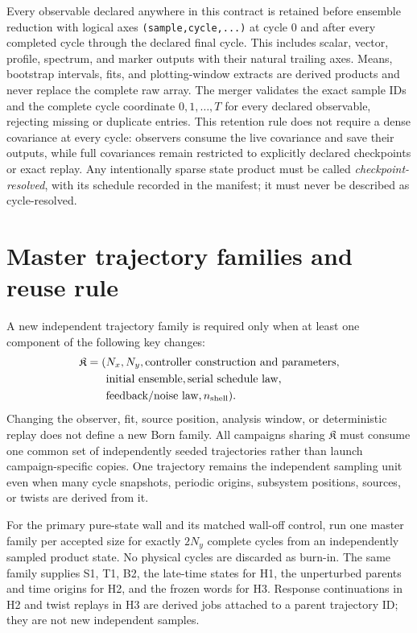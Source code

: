 \documentclass[aps,prx,twocolumn,floatfix,nofootinbib,superscriptaddress,longbibliography]{revtex4-2}
\newcommand{\code}[1]{\texttt{#1}}
\begin{document}
Every observable declared anywhere in this contract is retained before ensemble reduction
with logical axes \code{(sample,cycle,...)} at cycle 0 and after every completed cycle
through the declared final cycle.  This includes scalar, vector, profile, spectrum, and
marker outputs with their natural trailing axes.  Means, bootstrap intervals, fits, and
plotting-window extracts are derived products and never replace the complete raw array.
The merger validates the exact sample IDs and the complete cycle coordinate
$0,1,\ldots,T$ for every declared observable, rejecting missing or duplicate entries.
This retention rule does not require a dense covariance at every cycle: observers consume
the live covariance and save their outputs, while full covariances remain restricted to
explicitly declared checkpoints or exact replay.  Any intentionally sparse state product
must be called \emph{checkpoint-resolved}, with its schedule recorded in the manifest; it
must never be described as cycle-resolved.

\section{Master trajectory families and reuse rule}

A new independent trajectory family is required only when at least one component of the
following key changes:
\begin{equation}
 \begin{aligned}
 \mathfrak K=(&N_x,N_y,\text{controller construction and parameters},\\
              &\text{initial ensemble},\text{serial schedule law},\\
              &\text{feedback/noise law},n_{\rm shell}).
 \end{aligned}
 \label{eq:trajectory-family-key}
\end{equation}
Changing the observer, fit, source position, analysis window, or deterministic replay does
not define a new Born family.  All campaigns sharing $\mathfrak K$ must consume one common
set of independently seeded trajectories rather than launch campaign-specific copies.
One trajectory remains the independent sampling unit even when many cycle snapshots,
periodic origins, subsystem positions, sources, or twists are derived from it.

For the primary pure-state wall and its matched wall-off control, run one master family per
accepted size for exactly $2N_y$ complete cycles from an independently sampled product
state.  No physical cycles are discarded as burn-in.  The same family supplies S1, T1,
B2, the late-time states for H1,
the unperturbed parents and time origins for H2, and the frozen words for H3.
Response continuations in H2 and twist replays in H3 are derived jobs
attached to a parent trajectory ID; they are not new independent samples.
\end{document}
